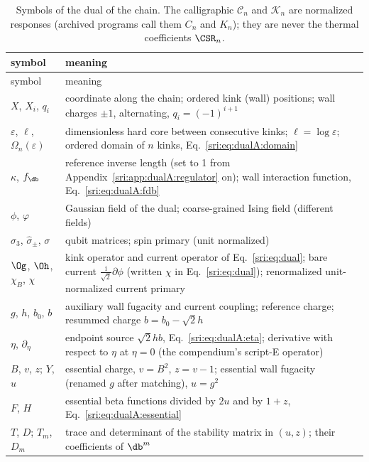 {\small
\renewcommand{\arraystretch}{1.15}
\begin{longtable}{@{}>{\raggedright\arraybackslash}p{}>{\raggedright\arraybackslash}p{}@{}}
\caption{Symbols of the dual of the chain. The calligraphic $\mathcal C_n$ and $\mathcal K_n$ are normalized
responses (archived programs call them $C_n$ and $K_n$); they are never the thermal coefficients
$\CSR_n$.}\label{sri:tab:dualA:notation}\\
\toprule
symbol & meaning\\
\midrule\endfirsthead
\toprule
symbol & meaning\\
\midrule\endhead
\bottomrule\endfoot
$X$, $X_i$, $q_i$ & coordinate along the chain; ordered kink (wall) positions; wall charges $\pm1$, alternating,
 $q_i=(-1)^{i+1}$\\
$\varepsilon$, $\ell$, $\Omega_n(\varepsilon)$ & dimensionless hard core between consecutive kinks; $\ell=\log\varepsilon$;
 ordered domain of $n$ kinks, Eq.~\eqref{sri:eq:dualA:domain}\\
$\kappa$, $f_{\db}$ & reference inverse length (set to 1 from Appendix~\ref{sri:app:dualA:regulator} on); wall
 interaction function, Eq.~\eqref{sri:eq:dualA:fdb}\\
$\phi$, $\varphi$ & Gaussian field of the dual; coarse-grained Ising field (different fields)\\
$\hat\sigma_3$, $\hat\sigma_\pm$, $\sigma$ & qubit matrices; spin primary (unit normalized)\\
$\Og$, $\Oh$, $\chi_B$, $\chi$ & kink operator and current operator of Eq.~\eqref{sri:eq:dual}; bare current
 $\frac{\mathrm i}{\sqrt2}\partial\phi$ (written $\chi$ in Eq.~\eqref{sri:eq:dual}); renormalized unit-normalized current
 primary\\
$g$, $h$, $b_0$, $b$ & auxiliary wall fugacity and current coupling; reference charge; resummed charge
 $b=b_0-\sqrt2h$\\
$\eta$, $\partial_\eta$ & endpoint source $\sqrt2hb$, Eq.~\eqref{sri:eq:dualA:eta}; derivative with respect to $\eta$ at
 $\eta=0$ (the compendium's script-E operator)\\
$B$, $v$, $z$; $Y$, $u$ & essential charge, $v=B^2$, $z=v-1$; essential wall fugacity (renamed $g$ after
 matching), $u=g^2$\\
$F$, $H$ & essential beta functions divided by $2u$ and by $1+z$, Eq.~\eqref{sri:eq:dualA:essential}\\
$T$, $D$; $T_m$, $D_m$ & trace and determinant of the stability matrix in $(u,z)$; their coefficients of $\db^m$\\

\end{longtable}}
